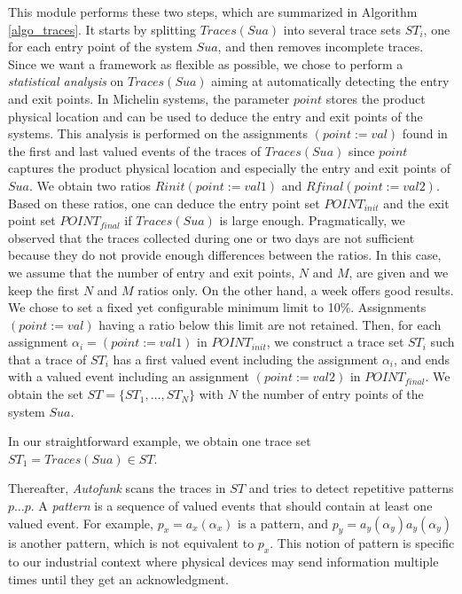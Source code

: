 This module performs these two steps, which are summarized in
Algorithm \ref{algo_traces}. It starts by splitting $Traces(Sua)$
into several trace sets $ST_i$, one for each entry point of the
system $\mathit{Sua}$, and then removes incomplete traces. Since
we want a framework as flexible as possible, we chose to perform
a \emph{statistical analysis} on $Traces(Sua)$ aiming at
automatically detecting the entry and exit points.  In Michelin
systems, the parameter $point$ stores the product physical
location and can be used to deduce the entry and exit points of
the systems.
This analysis is performed on the assignments $(point:=val)$
found in the first and last valued events of the traces of
$Traces(Sua)$ since $point$ captures the product physical
location and especially the entry and exit points of $\mathit{Sua}$.
We obtain two ratios $Rinit(point:=val1)$ and
$Rfinal(point:=val2)$.  Based on these ratios, one can deduce the
entry point set $POINT_{init}$ and the exit point set
$POINT_{final}$ if $Traces(Sua)$ is large enough. Pragmatically,
we observed that the traces collected during one or two days are
not sufficient because they do not provide enough differences
between the ratios. In this case, we assume that the number of
entry and exit points, $N$ and $M$, are given and we keep the
first $N$ and $M$ ratios only. On the other hand, a week offers
good results. We chose to set a fixed yet configurable
minimum limit to 10\%. Assignments $(point:=val)$ having a ratio
below this limit are not retained. Then, for each assignment
$\alpha_i=(point:=val1)$ in $POINT_{init}$, we construct a trace
set $ST_i$ such that a trace of $ST_i$ has a first valued event
including the assignment $\alpha_i$, and ends with a valued event
including an assignment $(point:=val2)$ in $POINT_{final}$. We
obtain the set $ST=\{ST_1,\dots,ST_N\}$ with $N$ the number of
entry points of the system $\mathit{Sua}$.

\begin{example}
In our straightforward example, we obtain one trace set
$ST_1 = Traces(Sua) \in ST$.
\end{example}

Thereafter, \textit{Autofunk} scans the traces in $ST$ and tries
to detect repetitive patterns $p \dots p$. A \emph{pattern} is a
sequence of valued events that should contain at least one valued
event. For example, $p_x = a_x(\alpha_x)$ is a pattern, and
$p_{y} = a_y(\alpha_y) a_y(\alpha_y)$ is another pattern, which
is not equivalent to $p_x$. This notion of pattern is specific to
our industrial context where physical devices may send
information multiple times until they get an acknowledgment.

